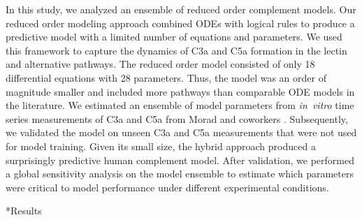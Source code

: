 \documentclass[12pt]{article}
\makeatletter
\renewcommand\section{\@startsection
	{subsection}{2}{0mm}
	{-0.2in}
	{0.05\baselineskip}
	{\normalfont\large\bfseries}}
\makeatother
\begin{document}
In this study, we analyzed an ensemble of reduced order complement models.
Our reduced order modeling approach combined ODEs with logical rules to produce a predictive model with a limited number of equations and parameters.
We used this framework to capture the dynamics of C3a and C5a formation in the lectin and alternative pathways.
The reduced order model consisted of only 18 differential equations with 28 parameters.
Thus, the model was an order of magnitude smaller and included more pathways than comparable ODE models in the literature.
We estimated an ensemble of model parameters from \textit{in~vitro} time series measurements of C3a and C5a from Morad and coworkers \cite{morad2015time}.
Subsequently, we validated the model on unseen C3a and C5a measurements that were not used for model training.
Given its small size, the hybrid approach produced a surprisingly predictive human complement model.
After validation, we performed a global sensitivity analysis on the model ensemble to estimate which parameters were critical to model performance under different experimental conditions.


\clearpage

\section*{Results}
\end{document}

